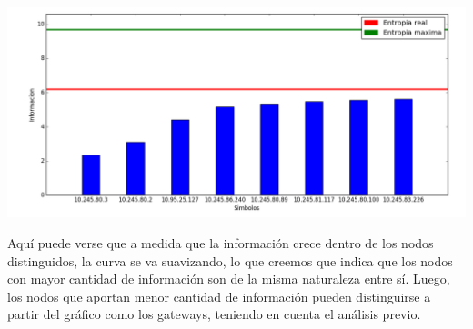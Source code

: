 \begin{center}
\includegraphics[scale=0.5]{imagenes/captura-tcorp-fuente-s1.png} 
\end{center}

Aquí puede verse que a medida que la información crece dentro de los nodos distinguidos, la curva se va suavizando, lo que creemos que indica que los nodos con mayor cantidad de información son de la misma naturaleza entre sí.
Luego, los nodos que aportan menor cantidad de información pueden distinguirse a partir del gráfico como los gateways, teniendo en cuenta el análisis previo.


